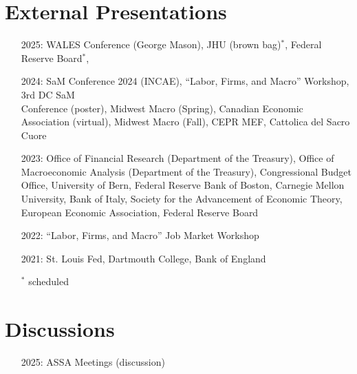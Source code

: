 \documentclass[margin,line]{res}                          %
\newenvironment{list1}{
	\begin{list}{\ding{113}}{%
			\setlength{\itemsep}{0in}
			\setlength{\parsep}{0in} \setlength{\parskip}{0in}
			\setlength{\topsep}{0in} \setlength{\partopsep}{0in}
			\setlength{\leftmargin}{0.17in}}}{\end{list}}
\begin{document}
\begin{resume}
	\section{\sc External Presentations}
	\begin{list1}
		\item[]
		\begin{itemize}\setlength{\itemindent}{.3cm}
			\item[2025:]\makebox[0.1cm]{\hfill} WALES Conference (George Mason), JHU (brown bag)$^\ast$, Federal Reserve Board$^\ast$,\smallskip
			\item[2024:]\makebox[0.1cm]{\hfill} SaM Conference 2024 (INCAE), ``Labor, Firms, and Macro'' Workshop, 3rd DC SaM\\ 
			\hspace*{0.55cm}Conference (poster), Midwest Macro (Spring), Canadian Economic Association (virtual),
			\hspace*{0.55cm}Midwest Macro (Fall), CEPR MEF, Cattolica del Sacro Cuore\smallskip
			\item[2023:]\makebox[0.1cm]{\hfill} Office of Financial Research (Department of the Treasury), Office of Macroeconomic \hspace*{0.55cm}Analysis (Department of the Treasury), Congressional Budget Office, University of Bern, \hspace*{0.55cm}Federal Reserve Bank of Boston, Carnegie Mellon University, Bank of Italy,  Society \hspace*{0.55cm}for the Advancement of Economic Theory, European Economic Association, Federal
			\hspace*{0.55cm}Reserve Board\smallskip
			\item[2022:]\makebox[0.1cm]{\hfill} ``Labor, Firms, and Macro'' Job Market Workshop \smallskip
			\item[2021:]\makebox[0.1cm]{\hfill} St. Louis Fed, Dartmouth College, Bank of England\\
			\item[]\makebox[-1cm]{\hfill} $^\ast$ scheduled
		\end{itemize}		
	\end{list1}
	
	\section{\sc Discussions}
	\begin{list1}
		\item[]
		\begin{itemize}\setlength{\itemindent}{.3cm}
			\item[2025:]\makebox[0.1cm]{\hfill} ASSA Meetings (discussion)
		\end{itemize}		
	\end{list1}
	

\end{resume}
\end{document}
